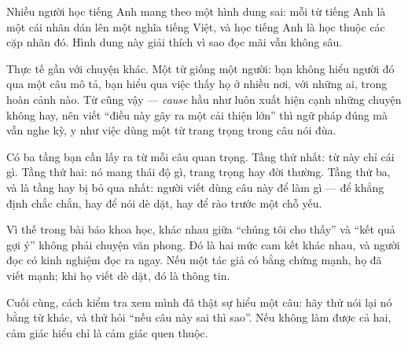 \documentclass[../../english.tex]{subfiles}
\begin{document}
\begin{dongian}
Nhiều người học tiếng Anh mang theo một hình dung sai: mỗi từ tiếng Anh là một cái nhãn dán lên một nghĩa tiếng Việt, và học tiếng Anh là học thuộc các cặp nhãn đó. Hình dung này giải thích vì sao đọc mãi vẫn không sâu.

Thực tế gần với chuyện khác. Một từ giống một người: bạn không hiểu người đó qua một câu mô tả, bạn hiểu qua việc thấy họ ở nhiều nơi, với những ai, trong hoàn cảnh nào. Từ cũng vậy --- \emph{cause} hầu như luôn xuất hiện cạnh những chuyện không hay, nên viết ``điều này gây ra một cải thiện lớn'' thì ngữ pháp đúng mà vẫn nghe kỳ, y như việc dùng một từ trang trọng trong câu nói đùa.

Có ba tầng bạn cần lấy ra từ mỗi câu quan trọng. Tầng thứ nhất: từ này chỉ cái gì. Tầng thứ hai: nó mang thái độ gì, trang trọng hay đời thường. Tầng thứ ba, và là tầng hay bị bỏ qua nhất: người viết dùng câu này để làm gì --- để khẳng định chắc chắn, hay để nói dè dặt, hay để rào trước một chỗ yếu.

Vì thế trong bài báo khoa học, khác nhau giữa ``chúng tôi cho thấy'' và ``kết quả gợi ý'' không phải chuyện văn phong. Đó là hai mức cam kết khác nhau, và người đọc có kinh nghiệm đọc ra ngay. Nếu một tác giả có bằng chứng mạnh, họ đã viết mạnh; khi họ viết dè dặt, đó là thông tin.

Cuối cùng, cách kiểm tra xem mình đã thật sự hiểu một câu: hãy thử nói lại nó bằng từ khác, và thử hỏi ``nếu câu này sai thì sao''. Nếu không làm được cả hai, cảm giác hiểu chỉ là cảm giác quen thuộc.
\end{dongian}
\end{document}
